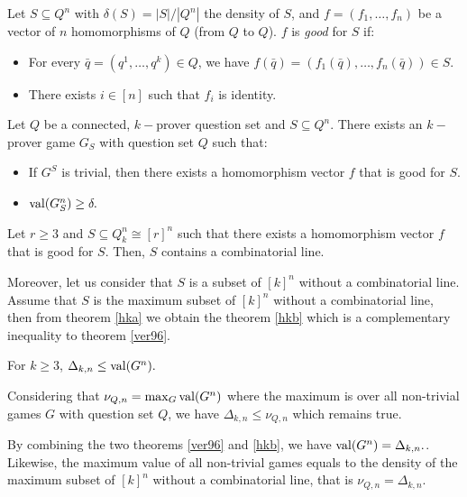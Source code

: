 Let $S\subseteq Q^n$ with $\delta(S)= |S|/|Q^n|$ the density of $S$, and $f=(f_1, \ldots, f_n)$ be a vector of $n$ homomorphisms of $Q$ (from $Q$ to $Q$). $f$ is \textit{good} for $S$ if:
\begin{itemize}
\item For every $\bar{q}=(q^1, \ldots,q^k) \in Q$, we have $f(\bar{q})=(f_1(\bar{q}), \ldots, f_n(\bar{q})) \in S.$
\item There exists $i \in  [n]$ such that $f_i$ is identity.
\end{itemize}

\begin{thm}	Let $Q$ be a connected, $k-$prover question set and $S \subseteq Q^n$. There exists an $k-$prover game $G_S$ with question set $Q$ such that:
\begin{itemize}
\item If $G^S$ is trivial, then there exists a homomorphism vector $f$ that is good for $S$.
\item $\mathrm{val} (G_S^n) \geq \delta.$
\end{itemize} \label{hhm}	\end{thm} 

\begin{pro}	Let $r \geq 3$ and $S \subseteq Q_k^n \cong [r]^n$ such that there exists a homomorphism vector $f$ that is good for $S$. Then, $S$ contains a combinatorial line.	\label{prop}\end{pro}
 
Moreover, let us consider that $S$ is a subset of $[k]^n$ without a combinatorial line. Assume that $S$ is the maximum subset of $[k]^n$ without a combinatorial line, then from theorem \eqref{hka} we obtain the theorem \eqref{hkb} which is a  complementary inequality to theorem \eqref{ver96}.
 
 \begin{thm} For $k \geq 3$, $\Delta_{k,n}	\leq \mathrm{val} (G^n).$ \label{hkb}	\end{thm}
 
 Considering that $\nu_{Q,n}=\max_G \mathrm{val} (G^n)$ where the maximum is over all non-trivial games $G$ with question set $Q$, we have $\Delta_{k,n}	\leq \nu_{Q,n}$ which remains true.
 
 By combining the two theorems \eqref{ver96} and \eqref{hkb}, we have $\mathrm{val} (G^n)=\Delta_{k,n}.$. Likewise, the maximum  value of  all non-trivial games equals to the density of the maximum subset of $[k]^n$ without a combinatorial line, that is $\nu_{Q,n}=\Delta_{k,n}.$
 
